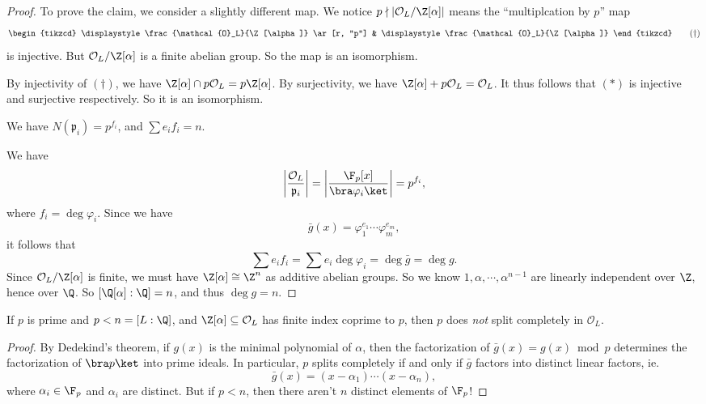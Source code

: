 \documentclass[a4paper]{article}
\begin{document}
\begin{proof}
  To prove the claim, we consider a slightly different map. We notice $p \nmid |\mathcal{O}_L/\Z[\alpha]|$ means the ``multiplcation by $p$'' map
  \[
    \begin{tikzcd}
      \displaystyle\frac{\mathcal{O}_L}{\Z[\alpha]} \ar[r, "p"] & \displaystyle\frac{\mathcal{O}_L}{\Z[\alpha]}
    \end{tikzcd}\tag{$\dagger$}
  \]
  is injective. But $\mathcal{O}_L/\Z[\alpha]$ is a finite abelian group. So the map is an isomorphism.

  By injectivity of $(\dagger)$, we have $\Z[\alpha] \cap p\mathcal{O}_L = p \Z[\alpha]$. By surjectivity, we have $\Z[\alpha] + p\mathcal{O}_L = \mathcal{O}_L$. It thus follows that $(*)$ is injective and surjective respectively. So it is an isomorphism.

  \begin{claim}
    We have $N(\mathfrak{p}_i) = p^{f_i}$, and $\sum e_i f_i = n$.
  \end{claim}

  We have
  \[
    \left|\frac{\mathcal{O}_L}{\mathfrak{p}_i}\right| = \left|\frac{\F_p[x]}{\bra \varphi_i\ket}\right| = p^{f_i},
  \]
  where $f_i = \deg \varphi_i$. Since we have
  \[
    \bar{g}(x) = \varphi_1^{e_1} \cdots \varphi_m^{e_m},
  \]
  it follows that
  \[
    \sum e_i f_i = \sum e_i \deg \varphi_i = \deg \bar{g} = \deg g.
  \]
  Since $\mathcal{O}_L/\Z[\alpha]$ is finite, we must have $\Z[\alpha] \cong \Z^n$ as additive abelian groups. So we know $1, \alpha, \cdots, \alpha^{n - 1}$ are linearly independent over $\Z$, hence over $\Q$. So $[\Q[\alpha]: \Q] = n$, and thus $\deg g = n$.
\end{proof}

\begin{cor}
  If $p$ is prime and $p < n = [L:\Q]$, and $\Z[\alpha] \subseteq \mathcal{O}_L$ has finite index coprime to $p$, then $p$ does \emph{not} split completely in $\mathcal{O}_L$.
\end{cor}

\begin{proof}
  By Dedekind's theorem, if $g(x)$ is the minimal polynomial of $\alpha$, then the factorization of $\bar{g}(x) = g(x)\bmod p$ determines the factorization of $\bra p\ket$ into prime ideals. In particular, $p$ splits completely if and only if $\bar{g}$ factors into distinct linear factors, ie.
  \[
    \bar{g}(x) = (x - \alpha_1) \cdots (x- \alpha_n),
  \]
  where $\alpha_i \in \F_p$ and $\alpha_i$ are distinct. But if $p < n$, then there aren't $n$ distinct elements of $\F_p$!
\end{proof}
\end{document}
